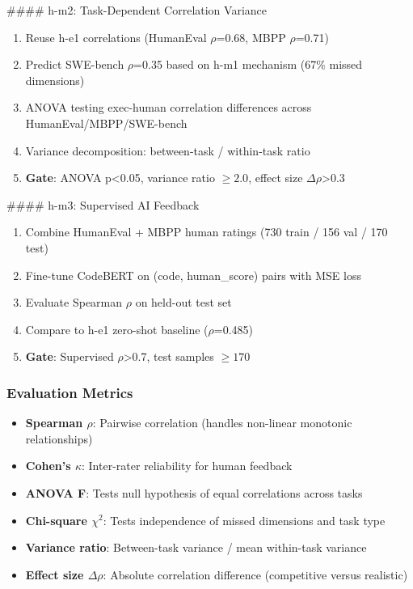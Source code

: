 \#\#\#\# h-m2: Task-Dependent Correlation Variance
\begin{enumerate}
\item Reuse h-e1 correlations (HumanEval $\rho$=0.68, MBPP $\rho$=0.71)
\item Predict SWE-bench $\rho$=0.35 based on h-m1 mechanism (67\% missed dimensions)
\item ANOVA testing exec-human correlation differences across HumanEval/MBPP/SWE-bench
\item Variance decomposition: between-task / within-task ratio
\item \textbf{Gate}: ANOVA p<0.05, variance ratio $\geq 2.0$, effect size $\Delta\rho$>0.3
\end{enumerate}

\#\#\#\# h-m3: Supervised AI Feedback
\begin{enumerate}
\item Combine HumanEval + MBPP human ratings (730 train / 156 val / 170 test)
\item Fine-tune CodeBERT on (code, human\_score) pairs with MSE loss
\item Evaluate Spearman $\rho$ on held-out test set
\item Compare to h-e1 zero-shot baseline ($\rho$=0.485)
\item \textbf{Gate}: Supervised $\rho$>0.7, test samples $\geq 170$
\end{enumerate}

\subsubsection{Evaluation Metrics}

\begin{itemize}
\item \textbf{Spearman $\rho$}: Pairwise correlation (handles non-linear monotonic relationships)
\item \textbf{Cohen's $\kappa$}: Inter-rater reliability for human feedback
\item \textbf{ANOVA F}: Tests null hypothesis of equal correlations across tasks
\item \textbf{Chi-square $\chi^2$}: Tests independence of missed dimensions and task type
\item \textbf{Variance ratio}: Between-task variance / mean within-task variance
\item \textbf{Effect size $\Delta\rho$}: Absolute correlation difference (competitive versus realistic)
\end{itemize}

